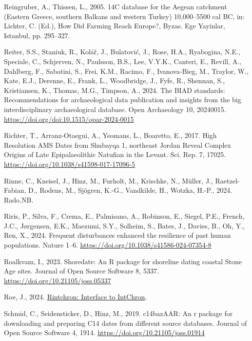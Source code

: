 \documentclass[
  number,
  doubleblind]{elsarticle}
\newlength{\cslhangindent}
\newenvironment{CSLReferences}[2] %
 {\begin{list}{}{%
  \setlength{\itemindent}{0pt}
  \setlength{\leftmargin}{0pt}
  \setlength{\parsep}{0pt}
  \ifodd #1
   \setlength{\leftmargin}{\cslhangindent}
   \setlength{\itemindent}{-1\cslhangindent}
  \fi
  \setlength{\itemsep}{#2\baselineskip}}}
 {\end{list}}
\begin{document}
\begin{CSLReferences}{1}{0}
Reingruber, A., Thissen, L., 2005. {14C} database for the {Aegean}
catchment ({Eastern Greece}, southern {Balkans} and western {Turkey})
10,000--5500 cal {BC}, in: Lichter, C. (Ed.), How {Did Farming Reach
Europe}?, Byzas. Ege Yayinlar, Istanbul, pp. 295--327.

Reiter, S.S., Staniuk, R., Kolář, J., Bulatović, J., Rose, H.A.,
Ryabogina, N.E., Speciale, C., Schjerven, N., Paulsson, B.S., Lee,
V.Y.K., Canteri, E., Revill, A., Dahlberg, F., Sabatini, S., Frei, K.M.,
Racimo, F., Ivanova-Bieg, M., Traylor, W., Kate, E.J., Derenne, E.,
Frank, L., Woodbridge, J., Fyfe, R., Shennan, S., Kristiansen, K.,
Thomas, M.G., Timpson, A., 2024. The BIAD standards: Recommendations for
archaeological data publication and insights from the big
interdisciplinary archaeological database. Open Archaeology 10,
20240015. \url{https://doi.org/doi:10.1515/opar-2024-0015}

Richter, T., Arranz-Otaegui, A., Yeomans, L., Boaretto, E., 2017. High
{Resolution AMS Dates} from {Shubayqa} 1, northeast {Jordan Reveal
Complex Origins} of {Late Epipalaeolithic Natufian} in the {Levant}.
Sci. Rep. 7, 17025. \url{https://doi.org/10.1038/s41598-017-17096-5}

Rinne, C., Kneisel, J., Hinz, M., Furholt, M., Krischke, N., Müller, J.,
Raetzel-Fabian, D., Rodens, M., Sjögren, K.-G., Vandkilde, H., Wotzka,
H.-P., 2024. Rado.{NB}.

Riris, P., Silva, F., Crema, E., Palmisano, A., Robinson, E., Siegel,
P.E., French, J.C., Jørgensen, E.K., Maezumi, S.Y., Solheim, S., Bates,
J., Davies, B., Oh, Y., Ren, X., 2024. Frequent disturbances enhanced
the resilience of past human populations. Nature 1--6.
\url{https://doi.org/10.1038/s41586-024-07354-8}

Roalkvam, I., 2023. Shoredate: {An R} package for shoreline dating
coastal {Stone Age} sites. Journal of Open Source Software 8, 5337.
\url{https://doi.org/10.21105/joss.05337}

Roe, J., 2024. \href{https://github.com/joeroe/rintchron}{Rintchron:
Interface to IntChron}.

Schmid, C., Seidensticker, D., Hinz, M., 2019. {c14bazAAR}: An r package
for downloading and preparing C14 dates from different source databases.
{Journal of Open Source Software} 4, 1914.
\url{https://doi.org/10.21105/joss.01914}


\end{CSLReferences}
\end{document}
